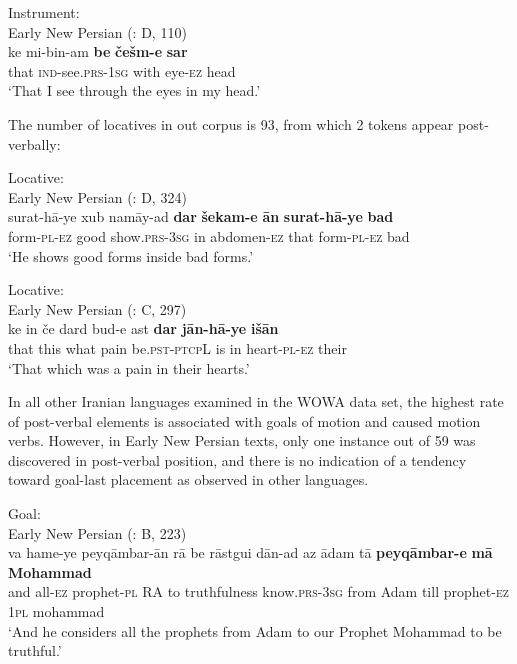 \documentclass[output=paper,colorlinks,citecolor=brown,draftmode]{langscibook}
\begin{document}
\ea\label{ENP:ex:8}
Instrument: \\
Early New Persian (\citealt{parizadeh_persian_2022}: D, 110) \\
\gll ke mi-bin-am \textbf{be} \textbf{češm-e} \textbf{sar} \\
that \textsc{ind-}see\textsc{.prs-1sg} with eye\textsc{-ez} head \\
\glt `That I see through the eyes in my head.'
\z

The number of locatives in out corpus is 93, from which 2 tokens appear post-verbally:


\newpage
\ea\label{ENP:ex:9}
Locative: \\
Early New Persian (\citealt{parizadeh_persian_2022}: D, 324) \\
\gll surat-hā-ye xub namāy-ad \textbf{dar} \textbf{šekam-e} \textbf{ān} \textbf{surat-hā-ye} \textbf{bad} \\
form\textsc{-pl-ez} good show\textsc{.prs-3sg} in abdomen\textsc{-ez} that form\textsc{-pl-ez} bad \\
\glt `He shows good forms inside bad forms.'
\z

\ea\label{ENP:ex:10}
Locative: \\
Early New Persian (\citealt{parizadeh_persian_2022}: C, 297) \\
\gll ke in če dard bud-e ast \textbf{dar} \textbf{jān-hā-ye} \textbf{išān} \\
that this what pain be\textsc{.pst-ptcpL} is in heart\textsc{-pl-ez} their \\
\glt `That which was a pain in their hearts.' 
\z

In all other Iranian languages examined in the WOWA data set, the highest rate of post-verbal elements is associated with goals of motion and caused motion verbs. However, in Early New Persian texts, only one instance out of 59 was discovered in post-verbal position, and there is no indication of a tendency toward goal-last placement as observed in other languages.

\ea\label{ENP:ex:11}
Goal: \\
Early New Persian (\citealt{parizadeh_persian_2022}: B, 223) \\
\gll va hame-ye peyqāmbar-ān rā be rāstgui dān-ad az ādam tā \textbf{peyqāmbar-e} \textbf{mā} \textbf{Mohammad} \\
and all\textsc{-ez} prophet\textsc{-pl} RA to truthfulness know\textsc{.prs-3sg} from Adam till prophet\textsc{-ez} \textsc{1pl} mohammad \\
\glt `And he considers all the prophets from Adam to our Prophet Mohammad to be truthful.' 
\z
\end{document}
